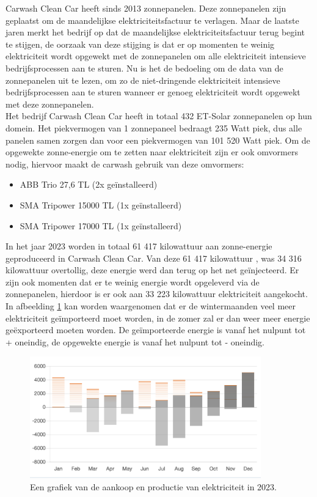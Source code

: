 Carwash Clean Car heeft sinds 2013 zonnepanelen. Deze zonnepanelen zijn geplaatst om de maandelijkse elektriciteitsfactuur te verlagen. Maar de laatste jaren merkt het bedrijf op dat de maandelijkse elektriciteitsfactuur terug begint te stijgen, de oorzaak van deze stijging is dat er op momenten te weinig elektriciteit wordt opgewekt met de zonnepanelen om alle elektriciteit intensieve bedrijfsprocessen aan te sturen. Nu is het de bedoeling om de data van de zonnepanelen uit te lezen, om zo de niet-dringende elektriciteit intensieve bedrijfsprocessen aan te sturen wanneer er genoeg elektriciteit wordt opgewekt met deze zonnepanelen.\\ 

Het bedrijf Carwash Clean Car heeft in totaal 432 ET-Solar zonnepanelen op hun domein. Het piekvermogen van 1 zonnepaneel bedraagt 235 Watt piek, dus alle panelen samen zorgen dan voor een piekvermogen van 101 520 Watt piek. Om de opgewekte zonne-energie om te zetten naar elektriciteit zijn er ook omvormers nodig, hiervoor maakt de carwash gebruik van deze omvormers:

\begin{itemize}
    \item ABB Trio 27,6 TL (2x geïnstalleerd)
    \item SMA Tripower 15000 TL (1x geïnstalleerd)
    \item SMA Tripower 17000 TL (1x geïnstalleerd)
\end{itemize}

In het jaar 2023 worden in totaal 61 417 kilowattuur aan zonne-energie geproduceerd in Carwash Clean Car. Van deze 61 417 kilowattuur , was 34 316 kilowattuur overtollig, deze energie werd dan terug op het net geïnjecteerd. Er zijn ook momenten dat er te weinig energie wordt opgeleverd via de zonnepanelen, hierdoor is er ook aan 33 223 kilowattuur elektriciteit aangekocht. In afbeelding \ref{fig:energie-productie-2023} kan worden waargenomen dat er de wintermaanden veel meer elektriciteit geïmporteerd moet worden, in de zomer zal er dan weer meer energie geëxporteerd moeten worden. De geïmporteerde energie is vanaf het nulpunt tot + oneindig, de opgewekte energie is vanaf het nulpunt tot - oneindig.

\begin{figure}[h]
    \includegraphics[width=10cm]{./graphics/Energie-opbrengsten-2023}
    \caption{Een grafiek van de aankoop en productie van elektriciteit in 2023.}
    \label{fig:energie-productie-2023}
\end{figure}

